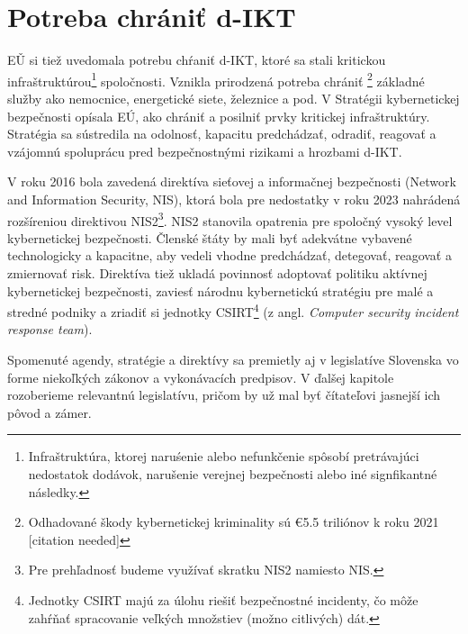 \section{Potreba chrániť d-IKT}
EǓ si tiež uvedomala potrebu chŕaniť d-IKT, ktoré sa stali kritickou infraštruktúrou\footnote{Infraštruktúra, ktorej naruśenie
alebo nefunkčenie spôsobí pretrávajúci nedostatok dodávok, narušenie verejnej bezpečnosti alebo iné signfikantné následky.}
spoločnosti. Vznikla prirodzená potreba chrániť \footnote{Odhadované škody kybernetickej kriminality sú €5.5 triliónov k
roku 2021 [citation needed]} základné služby ako nemocnice, energetické siete, železnice a pod. V Stratégii kybernetickej
bezpečnosti \cite{CSS} opísala EÚ, ako chrániť a posilniť prvky kritickej infraštruktúry. Stratégia sa sústredila na odolnosť,
kapacitu predchádzať, odradiť, reagovať a vzájomnú spoluprácu pred bezpečnostnými rizikami a hrozbami
d-IKT.

V roku 2016 bola zavedená direktíva sieťovej a informačnej bezpečnosti (Network and Information Security, NIS), ktorá
bola pre nedostatky v roku 2023 nahrádená rozšíreniou direktivou NIS2\footnote{Pre prehľadnosť budeme využívať skratku
NIS2 namiesto NIS.}. NIS2 stanovila opatrenia pre spoločný vysoký level kybernetickej bezpečnosti. Členské štáty by mali
byť adekvátne vybavené technologicky a kapacitne, aby vedeli vhodne predchádzať, detegovať, reagovať a zmiernovať risk.
Direktíva tiež ukladá povinnosť adoptovať politiku aktívnej kybernetickej bezpečnosti, zaviesť národnu kybernetickú stratégiu
pre malé a stredné podniky a zriadiť si jednotky CSIRT\footnote{Jednotky CSIRT majú za úlohu riešiť bezpečnostné incidenty,
čo môže zahŕňať spracovanie veľkých množstiev (možno citlivých) dát.} (z angl. \textit{Computer security incident response
team}).

Spomenuté agendy, stratégie a direktívy sa premietly aj v legislatíve Slovenska vo forme niekoľkých zákonov a vykonávacích
predpisov. V ďalšej kapitole rozoberieme relevantnú legislatívu, pričom by už mal byť čítateľovi jasnejší ich pôvod a zámer.
